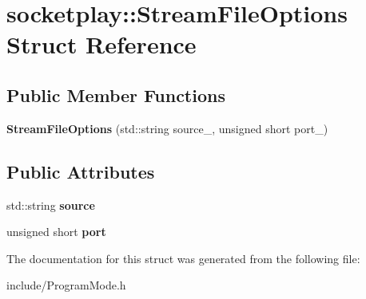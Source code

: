 \hypertarget{structsocketplay_1_1StreamFileOptions}{}\section{socketplay\+:\+:Stream\+File\+Options Struct Reference}
\label{structsocketplay_1_1StreamFileOptions}
\subsection*{Public Member Functions}
\begin{DoxyCompactItemize}
\item 
{\bfseries Stream\+File\+Options} (std\+::string source\+\_\+, unsigned short port\+\_\+)\hypertarget{structsocketplay_1_1StreamFileOptions_a7aab5ab60ff7ec991da8f7c384223601}{}\label{structsocketplay_1_1StreamFileOptions_a7aab5ab60ff7ec991da8f7c384223601}

\end{DoxyCompactItemize}
\subsection*{Public Attributes}
\begin{DoxyCompactItemize}
\item 
std\+::string {\bfseries source}\hypertarget{structsocketplay_1_1StreamFileOptions_a80cbbd3c5d4ea0889b594b6c44b9698b}{}\label{structsocketplay_1_1StreamFileOptions_a80cbbd3c5d4ea0889b594b6c44b9698b}

\item 
unsigned short {\bfseries port}\hypertarget{structsocketplay_1_1StreamFileOptions_aeb9df5fa138c2fe3ce18ae5fa9c2f271}{}\label{structsocketplay_1_1StreamFileOptions_aeb9df5fa138c2fe3ce18ae5fa9c2f271}

\end{DoxyCompactItemize}


The documentation for this struct was generated from the following file\+:\begin{DoxyCompactItemize}
\item 
include/Program\+Mode.\+h\end{DoxyCompactItemize}
